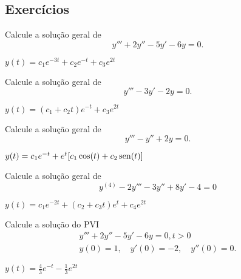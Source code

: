 \subsection*{Exercícios}

\begin{exer}
  Calcule a solução geral de
  \begin{equation}
    y''' + 2y'' - 5y' - 6y = 0.
  \end{equation}
\end{exer}
\begin{resp}
  $y(t) = c_1 e^{- 3 t} + c_{2} e^{- t} + c_{3} e^{2 t}$
\end{resp}

\begin{exer}
  Calcule a solução geral de
  \begin{equation}
    y''' - 3y'- 2y = 0.
  \end{equation}
\end{exer}
\begin{resp}
  $y(t) = (c_1 + c_2t)e^{-t} + c_3e^{2t}$
\end{resp}

\begin{exer}
  Calcule a solução geral de
  \begin{equation}
    y''' - y'' + 2y = 0.
  \end{equation}
\end{exer}
\begin{resp}
  $y(t) = c_1e^{-t} + e^{t}[c_1\cos(t) + c_2\operatorname{sen}(t)]$
\end{resp}

\begin{exer}
  Calcule a solução geral de
  \begin{equation}
    y^{(4)}-2y'''-3y''+8y'-4=0
  \end{equation}
\end{exer}
\begin{resp}
  $y(t) = c_1e^{-2t} + (c_2+c_3t)e^{t}+c_4e^{2t}$
\end{resp}

\begin{exer}
  Calcule a solução do PVI
  \begin{align}
    y''' + 2y'' - 5y' - 6y = 0, t>0\\
    y(0)=1,\quad y'(0)=-2,\quad y''(0)=0.
  \end{align}
\end{exer}
\begin{resp}
  $y(t) = \frac{4}{3}e^{-t} - \frac{1}{3}e^{2t}$
\end{resp}

